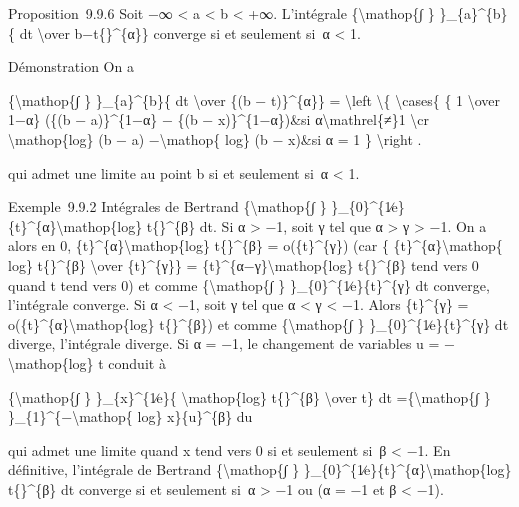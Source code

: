 \documentclass[]{article}
\begin{document}
Proposition~9.9.6 Soit −∞ \textless{} a \textless{} b \textless{} +∞.
L'intégrale \{\textbackslash{}mathop\{∫ \} \}\_\{a\}\^{}\{b\}\{ dt
\textbackslash{}over \textbar{}b−t\{\textbar{}\}\^{}\{α\}\} converge si
et seulement si~α \textless{} 1.

Démonstration On a

\{\textbackslash{}mathop\{∫ \} \}\_\{a\}\^{}\{b\}\{ dt
\textbackslash{}over \{(b − t)\}\^{}\{α\}\} = \textbackslash{}left
\textbackslash{}\{ \textbackslash{}cases\{ \{ 1 \textbackslash{}over
1−α\} (\{(b − a)\}\^{}\{1−α\} − \{(b − x)\}\^{}\{1−α\})\&si
α\textbackslash{}mathrel\{≠\}1 \textbackslash{}cr
\textbackslash{}mathop\{log\} (b − a) −\textbackslash{}mathop\{ log\} (b
− x)\&si α = 1 \} \textbackslash{}right .

qui admet une limite au point b si et seulement si~α \textless{} 1.

Exemple~9.9.2 Intégrales de Bertrand \{\textbackslash{}mathop\{∫ \}
\}\_\{0\}\^{}\{1∕e\}\{t\}\^{}\{α\}\textbar{}\textbackslash{}mathop\{log\}
t\{\textbar{}\}\^{}\{β\} dt. Si α \textgreater{} −1, soit γ tel que α
\textgreater{} γ \textgreater{} −1. On a alors en 0,
\{t\}\^{}\{α\}\textbar{}\textbackslash{}mathop\{log\}
t\{\textbar{}\}\^{}\{β\} = o(\{t\}\^{}\{γ\}) (car \{
\{t\}\^{}\{α\}\textbar{}\textbackslash{}mathop\{ log\}
t\{\textbar{}\}\^{}\{β\} \textbackslash{}over \{t\}\^{}\{γ\}\} =
\{t\}\^{}\{α−γ\}\textbar{}\textbackslash{}mathop\{log\}
t\{\textbar{}\}\^{}\{β\} tend vers 0 quand t tend vers 0) et comme
\{\textbackslash{}mathop\{∫ \} \}\_\{0\}\^{}\{1∕e\}\{t\}\^{}\{γ\} dt
converge, l'intégrale converge. Si α \textless{} −1, soit γ tel que α
\textless{} γ \textless{} −1. Alors \{t\}\^{}\{γ\} =
o(\{t\}\^{}\{α\}\textbar{}\textbackslash{}mathop\{log\}
t\{\textbar{}\}\^{}\{β\}) et comme \{\textbackslash{}mathop\{∫ \}
\}\_\{0\}\^{}\{1∕e\}\{t\}\^{}\{γ\} dt diverge, l'intégrale diverge. Si α
= −1, le changement de variables u = −\textbackslash{}mathop\{log\} t
conduit à

\{\textbackslash{}mathop\{∫ \} \}\_\{x\}\^{}\{1∕e\}\{
\textbar{}\textbackslash{}mathop\{log\} t\{\textbar{}\}\^{}\{β\}
\textbackslash{}over t\} dt =\{\textbackslash{}mathop\{∫ \}
\}\_\{1\}\^{}\{−\textbackslash{}mathop\{ log\} x\}\{u\}\^{}\{β\} du

qui admet une limite quand x tend vers 0 si et seulement si~β
\textless{} −1. En définitive, l'intégrale de Bertrand
\{\textbackslash{}mathop\{∫ \}
\}\_\{0\}\^{}\{1∕e\}\{t\}\^{}\{α\}\textbar{}\textbackslash{}mathop\{log\}
t\{\textbar{}\}\^{}\{β\} dt converge si et seulement si~α \textgreater{}
−1 ou (α = −1 et β \textless{} −1).
\end{document}
